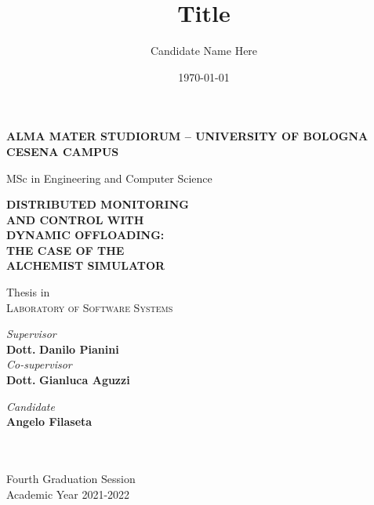 \title{Title}
\author{Candidate Name Here}
\date{\today}

\begin{titlepage}
	\begin{center}

		\large
		\textbf{ALMA MATER STUDIORUM -- UNIVERSITY OF BOLOGNA \\ CESENA CAMPUS}
		\\
		\noindent\hrulefill
		\vspace{0.4cm}

		\Large
		MSc in Engineering and Computer Science

		\Huge
		\vspace{4cm}
		\textbf{
			DISTRIBUTED MONITORING\\
			AND CONTROL WITH\\
			DYNAMIC OFFLOADING:\\
			THE CASE OF THE\\
			ALCHEMIST SIMULATOR
		}

		\large
		\vspace{1cm}
		Thesis in
		\\
		\textsc{Laboratory of Software Systems}

		\vspace{5.5cm}
		\begin{minipage}[t]{0.64\textwidth}
			\begin{flushleft}
				\textit{Supervisor}
				\\
				\textbf{Dott.} \textbf{Danilo Pianini}
				\\
				\vspace{0.4cm}
				\textit{Co-supervisor}
				\\
				\textbf{Dott.} \textbf{Gianluca Aguzzi}
			\end{flushleft}
		\end{minipage}
		\begin{minipage}[t]{0.34\textwidth}
			\begin{flushright}
				\textit{Candidate}
				\\
				\textbf{Angelo Filaseta}
			\end{flushright}
		\end{minipage}\\

		\vfill
		\noindent\hrulefill
		\vspace{0.3cm}
		\Large
		\\
		Fourth Graduation Session
		\\
		Academic Year 2021-2022
	\end{center}
\end{titlepage}
\restoregeometry
